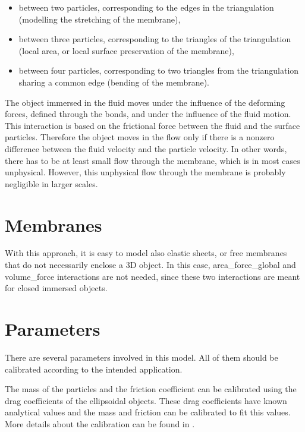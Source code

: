 \begin{itemize}
\item between two particles, corresponding to the edges in the triangulation (modelling the stretching of the membrane), 
\item between three particles, corresponding to the triangles of the triangulation (local area, or local surface preservation of the membrane), 
\item between four particles, corresponding to two triangles from the triangulation sharing a common edge (bending of the membrane). 
\end{itemize}

The object immersed  in the fluid moves under the influence of the deforming forces, defined through the bonds, and under the influence of the fluid motion. This interaction is based on the frictional force between the fluid and the surface particles. Therefore the object moves in the flow only if there is a nonzero difference between the fluid velocity and the particle velocity. In other words, there has to be at least small flow through the membrane, which is in most cases unphysical. However, this unphysical flow through the membrane is probably negligible in larger scales.

\section{Membranes}
With this approach, it is easy to model also elastic sheets, or free membranes that do not necessarily enclose a 3D object. In this case, area\_{}force\_{}global and volume\_{}force interactions are not needed, since these two interactions are meant for closed immersed objects.

\section{Parameters}
There are several parameters involved in this model. All of them should be calibrated according to the intended application. 
The mass of the particles and the friction coefficient can be calibrated using the drag coefficients of the ellipsoidal objects. These drag coefficients have known analytical values and the mass and friction can be calibrated to fit this values. More details about the calibration can be found in \cite{cimrak}.

